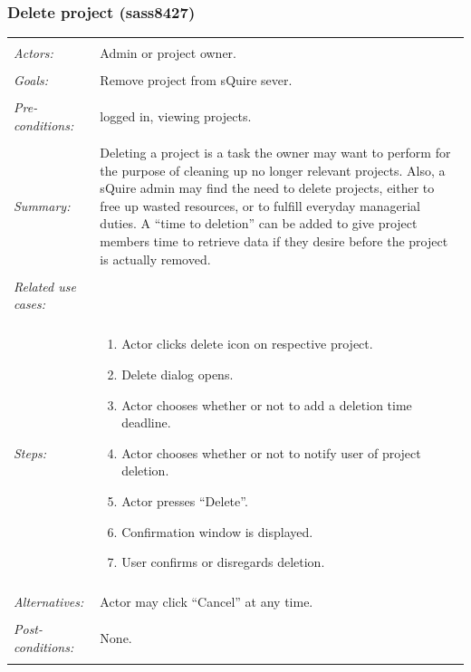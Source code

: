 \documentclass[11pt]{report}
\begin{document}
\subsubsection{Delete project (sass8427)}
\begin{tabular}{ p{2cm} p{12cm} }
 \hline
 \\
 \textit{Actors:} & Admin or project owner. \\ 
 \\
 \textit{Goals:} & Remove project from sQuire sever. \\
 \\
 \textit{Pre-conditions:} & logged in, viewing projects.  \\
\\
 \textit{Summary:} & Deleting a project is a task the owner may want to perform for the purpose of cleaning up no longer relevant projects. Also, a sQuire admin may find the need to delete projects, either to free up wasted resources, or to fulfill everyday managerial duties. A “time to deletion” can be added to give project members time to retrieve data if they desire before the project is actually removed. \\ 
 \\
 \textit{Related use cases:} & \\ 
 \\
 \textit{Steps:} & \begin{enumerate}
  \item Actor clicks delete icon on respective project.
  \item Delete dialog opens.
  \item Actor chooses whether or not to add a deletion time deadline. 
  \item Actor chooses whether or not to notify user of project deletion. 
  \item Actor presses “Delete”. 
  \item Confirmation window is displayed.
  \item User confirms or disregards deletion.
 \end{enumerate} \\
 \\
 \textit{Alternatives:} & Actor may click “Cancel” at any time. \\
 \\
 \textit{Post-conditions:} & None. \\
 \\
\hline
\end{tabular}
\end{document}
